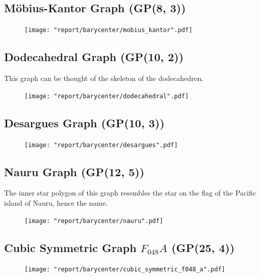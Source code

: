 \documentclass[11pt]{report}
\begin{document}
\pagebreak

\subsection{M{\"o}bius-Kantor Graph (GP(8, 3))}

\begin{figure}[H]
    \centering
    \texttt{[image: "report/barycenter/mobius\_kantor".pdf]}
\end{figure}

\subsection{Dodecahedral Graph (GP(10, 2))}
This graph can be thought of the skeleton of the dodecahedron.

\begin{figure}[H]
    \centering
    \texttt{[image: "report/barycenter/dodecahedral".pdf]}
\end{figure}

\pagebreak

\subsection{Desargues Graph (GP(10, 3))}
\begin{figure}[H]
    \centering
    \texttt{[image: "report/barycenter/desargues".pdf]}
\end{figure}

\pagebreak
\subsection{Nauru Graph (GP(12, 5))}
The inner star polygon of this graph resembles the star on the flag of the Pacific island of Nauru, hence the name.~\cite{nauru}

\begin{figure}[H]
    \centering
    \texttt{[image: "report/barycenter/nauru".pdf]}
\end{figure}

\pagebreak

\subsection{Cubic Symmetric Graph $F_{048} A$ (GP(25, 4))}

\begin{figure}[H]
    \centering
    \texttt{[image: "report/barycenter/cubic\_symmetric\_f048\_a".pdf]}
\end{figure}

\printbibliography
\end{document}
